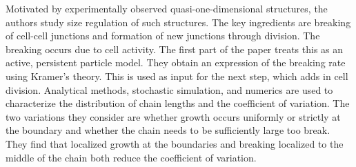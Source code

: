 \documentclass[12pt,oneside,letterpaper]{article}
\begin{document}
Motivated by experimentally observed quasi-one-dimensional structures, the authors study size regulation of such structures. The key ingredients are breaking of cell-cell junctions and formation of new junctions through division. The breaking occurs due to cell activity. The first part of the paper treats this as an active, persistent particle model. They obtain an expression of the breaking rate using Kramer's theory. This is used as input for the next step, which adds in cell division. Analytical methods, stochastic simulation, and numerics are used to characterize the distribution of chain lengths and the coefficient of variation. The two variations they consider are whether growth occurs uniformly or strictly at the boundary and whether the chain needs to be sufficiently large too break. They find that localized growth at the boundaries and breaking localized to the middle of the chain both reduce the coefficient of variation.
\end{document}
